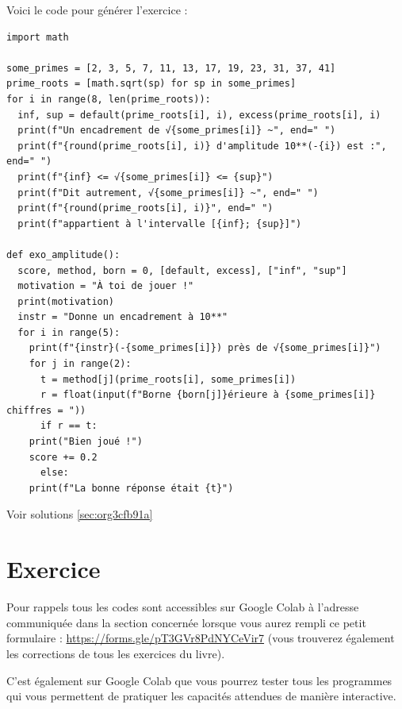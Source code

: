 \documentclass[a4paper, 11pt, twoside]{book}
\begin{document}
Voici le code pour générer l'exercice :
\begin{verbatim}
import math

some_primes = [2, 3, 5, 7, 11, 13, 17, 19, 23, 31, 37, 41]
prime_roots = [math.sqrt(sp) for sp in some_primes]
for i in range(8, len(prime_roots)):
  inf, sup = default(prime_roots[i], i), excess(prime_roots[i], i)
  print(f"Un encadrement de √{some_primes[i]} ~", end=" ")
  print(f"{round(prime_roots[i], i)} d'amplitude 10**(-{i}) est :", end=" ")
  print(f"{inf} <= √{some_primes[i]} <= {sup}")
  print(f"Dit autrement, √{some_primes[i]} ~", end=" ")
  print(f"{round(prime_roots[i], i)}", end=" ")
  print(f"appartient à l'intervalle [{inf}; {sup}]")

def exo_amplitude():
  score, method, born = 0, [default, excess], ["inf", "sup"]
  motivation = "À toi de jouer !"
  print(motivation)
  instr = "Donne un encadrement à 10**"
  for i in range(5):
    print(f"{instr}(-{some_primes[i]}) près de √{some_primes[i]}")
    for j in range(2):
      t = method[j](prime_roots[i], some_primes[i])
      r = float(input(f"Borne {born[j]}érieure à {some_primes[i]} chiffres = "))
      if r == t:
	print("Bien joué !")
	score += 0.2
      else:
	print(f"La bonne réponse était {t}")
\end{verbatim}

Voir solutions \ref{sec:org3cfb91a}

\section{Exercice}
\label{sec:org0e68f9c}
Pour rappels tous les codes sont accessibles sur Google Colab à
l'adresse communiquée dans la section concernée lorsque vous
aurez rempli ce petit formulaire :
\url{https://forms.gle/pT3GVr8PdNYCeVir7} (vous trouverez également
les corrections de tous les exercices du livre).

C'est également sur Google Colab que vous pourrez tester tous les
programmes qui vous permettent de pratiquer les capacités attendues
de manière interactive.
\end{document}
